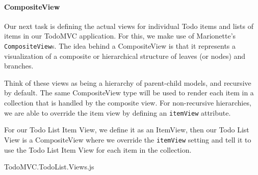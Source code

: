 \documentclass[9pt]{book}
\begin{document}
\paragraph{CompositeView}\label{compositeview}

Our next task is defining the actual views for individual Todo items and
lists of items in our TodoMVC application. For this, we make use of
Marionette's \texttt{CompositeView}s. The idea behind a CompositeView is
that it represents a visualization of a composite or hierarchical
structure of leaves (or nodes) and branches.

Think of these views as being a hierarchy of parent-child models, and
recursive by default. The same CompositeView type will be used to render
each item in a collection that is handled by the composite view. For
non-recursive hierarchies, we are able to override the item view by
defining an \texttt{itemView} attribute.

For our Todo List Item View, we define it as an ItemView, then our Todo
List View is a CompositeView where we override the \texttt{itemView}
setting and tell it to use the Todo List Item View for each item in the
collection.

TodoMVC.TodoList.Views.js
\end{document}
